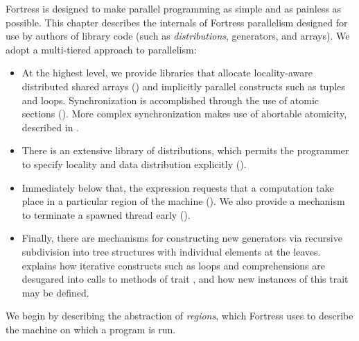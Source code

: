 %
%
%
%


\label{parallel-intro}
Fortress is designed to make parallel programming as simple and as
painless as possible.  This chapter describes the internals of
Fortress parallelism designed for use by authors of library code (such as
\emph{distributions}, generators, and arrays).  We adopt a multi-tiered
approach to parallelism:
\begin{itemize}

\item At the highest level, we provide libraries that allocate
locality-aware distributed
shared arrays () and implicitly
  parallel constructs such as tuples and loops.  Synchronization is
  accomplished through the use of atomic sections ().
  More complex synchronization makes use of abortable atomicity,
  described in .

\item There is an extensive library of distributions, which
  permits the programmer to specify locality and data distribution
  explicitly ().

\item
Immediately below that, the  expression requests that a
computation take place in a particular region of the machine
().
  We also provide a mechanism to
  terminate a spawned thread early ().

\item Finally, there are mechanisms for constructing new generators
  via recursive subdivision into tree structures with individual
  elements at the leaves.
   explains how
  iterative constructs such as  loops and comprehensions
  are desugared into calls to methods of trait , and how
  new instances of this trait may be defined.

\end{itemize}

We begin by describing the abstraction of \emph{regions}, which Fortress
uses to describe the machine on which a program is run.
